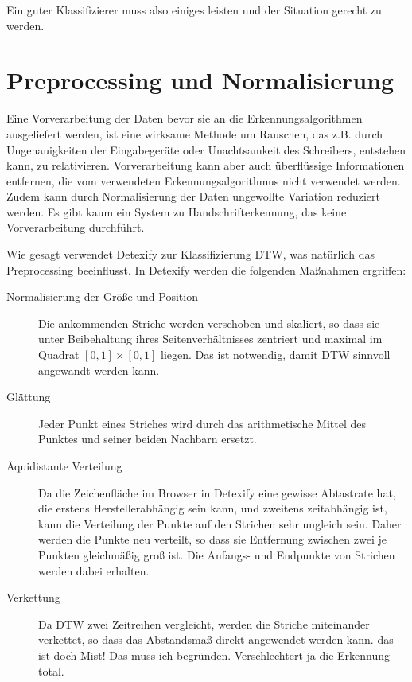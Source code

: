Ein guter Klassifizierer muss also einiges leisten und der Situation gerecht zu werden.

\section{Preprocessing und Normalisierung} %
\label{sec:preprocessing_und_normalisierung}

Eine Vorverarbeitung der Daten bevor sie an die Erkennungsalgorithmen ausgeliefert werden, ist eine wirksame Methode um Rauschen, das z.B. durch Ungenauigkeiten der Eingabegeräte oder Unachtsamkeit des Schreibers, entstehen kann, zu relativieren. Vorverarbeitung kann aber auch überflüssige Informationen entfernen, die vom verwendeten Erkennungsalgorithmus nicht verwendet werden. Zudem kann durch Normalisierung der Daten ungewollte Variation reduziert werden. Es gibt kaum ein System zu Handschrifterkennung, das keine Vorverarbeitung durchführt.

Wie gesagt verwendet Detexify zur Klassifizierung \ac{DTW}, was natürlich das Preprocessing beeinflusst. In Detexify werden die folgenden Maßnahmen ergriffen:

\begin{description}
  \item[Normalisierung der Größe und Position]
    Die ankommenden Striche werden verschoben und skaliert, so dass sie unter Beibehaltung ihres Seitenverhältnisses zentriert und maximal im Quadrat $[0,1]\times[0,1]$ liegen. Das ist notwendig, damit \ac{DTW} sinnvoll angewandt werden kann.
  \item[Glättung]
    Jeder Punkt eines Striches wird durch das arithmetische Mittel des Punktes und seiner beiden Nachbarn ersetzt.
  \item[Äquidistante Verteilung]
    Da die Zeichenfläche im Browser in Detexify eine gewisse Abtastrate hat, die erstens Herstellerabhängig sein kann, und zweitens zeitabhängig ist, kann die Verteilung der Punkte auf den Strichen sehr ungleich sein. Daher werden die Punkte neu verteilt, so dass sie Entfernung zwischen zwei je Punkten gleichmäßig groß ist. Die Anfangs- und Endpunkte von Strichen werden dabei erhalten.
  \item[Verkettung]
    Da \ac{DTW} zwei Zeitreihen vergleicht, werden die Striche miteinander verkettet, so dass das Abstandsmaß direkt angewendet werden kann. \TODO das ist doch Mist! Das muss ich begründen. Verschlechtert ja die Erkennung total.
\end{description}


